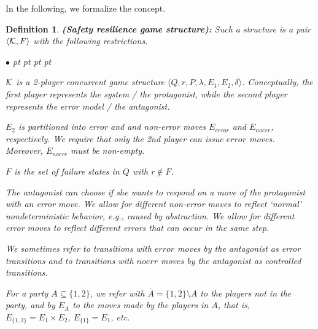 \documentclass[times,10pt,twocolumn]{article}
\newtheorem{definition}{Definition}
\newcommand{\emerr}{\textit{error}}
\newcommand{\emnerr}{\textit{noerr}}
\newcommand{\calk}{{\cal K}}
\newenvironment{list1}{\begin{list}{$\bullet$}
{\topsep 0 pt \parsep 0 pt \partopsep 0 pt \itemsep 0
pt}}{\end{list}}
\begin{document}
In the following, we formalize the concept.  

\begin{definition} \label{def.srgs} 
{\bf (Safety resilience game structure):} 
Such a structure is a pair $\langle \calk, F\rangle$ with the following 
restrictions. 
\begin{list1} 
\item $\calk$ is a 2-player concurrent game structure 
  $\langle Q,r,P,\lambda,E_1,E_2,\delta\rangle$.  
  Conceptually, the first player represents the system / the protagonist, while 
  the second player represents the error model / the antagonist.  
\item $E_2$ is partitioned into error and and non-error moves $E_{\emerr}$ and $E_{\emnerr}$, respectively.
We require that only the 2nd player can issue $\emerr$ moves.  
Moreover, $E_{\emnerr}$ must be non-empty. 
\item $F$ is the set of failure states in $Q$ with $r\not\in F$.   
\end{list1} 


The antagonist can choose if she wants to respond on a move of the protagonist with an error move. \label{abstraction}
We allow for different non-error moves to reflect `normal' nondeterministic behavior, e.g., caused by abstraction. 
We allow for different error moves to reflect different errors that can occur in the same step.

We sometimes refer\label{reply1.reffer} to transitions with $\emerr$ moves by the antagonist as \emph{error transitions} and 
to transitions with  $\emnerr$ moves by the antagonist as \emph{controlled transitions}.  

For a party $A \subseteq \{1,2\}$, we refer with $\overline{A} = \{1,2\} \setminus A$ to the players not in the party, and by $E_A$ to the moves made by the players in $A$, that is, $E_{\{1,2\}} = E_1 \times E_2$, $E_{\{1\}} = E_1$, etc.



\end{definition}
\end{document}
